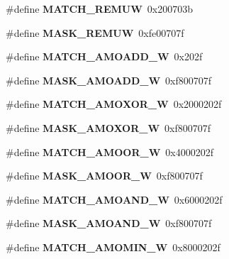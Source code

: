 \begin{DoxyCompactItemize}
\#define {\bfseries M\+A\+T\+C\+H\+\_\+\+R\+E\+M\+UW}~0x200703b
\item 
\mbox{\label{riscv-utility_8h_a22950acae5a83ca9b5bd492416204e23}} 
\#define {\bfseries M\+A\+S\+K\+\_\+\+R\+E\+M\+UW}~0xfe00707f
\item 
\mbox{\label{riscv-utility_8h_a92142853f05ba8c9545448a2e59cdee2}} 
\#define {\bfseries M\+A\+T\+C\+H\+\_\+\+A\+M\+O\+A\+D\+D\+\_\+W}~0x202f
\item 
\mbox{\label{riscv-utility_8h_ac4d5a25aedcd5854f725c482b41930fd}} 
\#define {\bfseries M\+A\+S\+K\+\_\+\+A\+M\+O\+A\+D\+D\+\_\+W}~0xf800707f
\item 
\mbox{\label{riscv-utility_8h_aca8013f18dbda079f2fb19f37cd3b5aa}} 
\#define {\bfseries M\+A\+T\+C\+H\+\_\+\+A\+M\+O\+X\+O\+R\+\_\+W}~0x2000202f
\item 
\mbox{\label{riscv-utility_8h_ab59f3affb09bc2f4689963cb3de5f093}} 
\#define {\bfseries M\+A\+S\+K\+\_\+\+A\+M\+O\+X\+O\+R\+\_\+W}~0xf800707f
\item 
\mbox{\label{riscv-utility_8h_a6fd0a8935f1e09425b97cdd84c0adc30}} 
\#define {\bfseries M\+A\+T\+C\+H\+\_\+\+A\+M\+O\+O\+R\+\_\+W}~0x4000202f
\item 
\mbox{\label{riscv-utility_8h_adf3ae2db8603db0a7a3456e7a2cd57ea}} 
\#define {\bfseries M\+A\+S\+K\+\_\+\+A\+M\+O\+O\+R\+\_\+W}~0xf800707f
\item 
\mbox{\label{riscv-utility_8h_ade3e2082326800416a2e8417a44c1f25}} 
\#define {\bfseries M\+A\+T\+C\+H\+\_\+\+A\+M\+O\+A\+N\+D\+\_\+W}~0x6000202f
\item 
\mbox{\label{riscv-utility_8h_a79b7db2beadec0c284112130f5748d26}} 
\#define {\bfseries M\+A\+S\+K\+\_\+\+A\+M\+O\+A\+N\+D\+\_\+W}~0xf800707f
\item 
\mbox{\label{riscv-utility_8h_abf35f8bf68405ec652a8554ac6c5f63b}} 
\#define {\bfseries M\+A\+T\+C\+H\+\_\+\+A\+M\+O\+M\+I\+N\+\_\+W}~0x8000202f
\item 

\end{DoxyCompactItemize}
